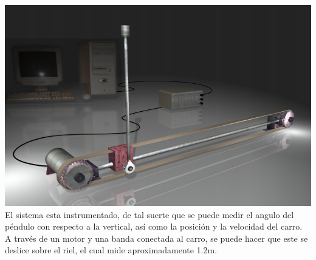 \documentclass[12pt,a4paper]{book}
\begin{document}
\includegraphics[scale=.4]{./1_pendulo.png}
\\
El sistema esta instrumentado, de tal suerte que
se puede medir el angulo del péndulo con respecto a la vertical, así como
la posición y la velocidad del carro. A través de un motor y una banda
conectada al carro, se puede hacer que este se deslice sobre el riel, el cual
mide aproximadamente 1.2m. \\

\newpage
\end{document}
